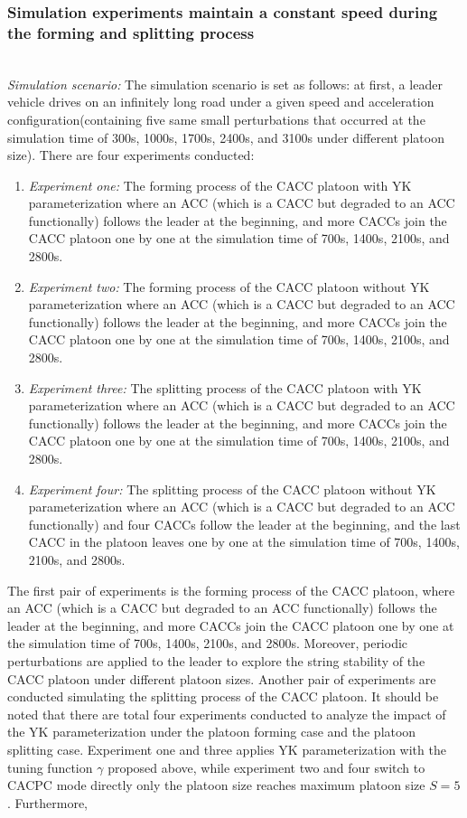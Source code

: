\documentclass[trsc,nonblindrev]{informs3} %
\begin{document}
\subsubsection{Simulation experiments maintain a constant speed during the forming and splitting process}
\label{Section 5.2.1}

~\\

\textit{Simulation scenario:} The simulation scenario is set as follows: at first, a leader vehicle drives on an infinitely long road under a given speed and acceleration configuration(containing five same small perturbations that occurred at the simulation time of 300s, 1000s, 1700s, 2400s, and 3100s under different platoon size). There are four experiments conducted:
\begin{enumerate}
    \item \textit{Experiment one:} The forming process of the CACC platoon with YK parameterization where an ACC (which is a CACC but degraded to an ACC functionally) follows the leader at the beginning, and more CACCs join the CACC platoon one by one at the simulation time of 700s, 1400s, 2100s, and 2800s.
    \item \textit{Experiment two:} The forming process of the CACC platoon without YK parameterization where an ACC (which is a CACC but degraded to an ACC functionally) follows the leader at the beginning, and more CACCs join the CACC platoon one by one at the simulation time of 700s, 1400s, 2100s, and 2800s.
    \item \textit{Experiment three:} The splitting process of the CACC platoon with YK parameterization where an ACC (which is a CACC but degraded to an ACC functionally) follows the leader at the beginning, and more CACCs join the CACC platoon one by one at the simulation time of 700s, 1400s, 2100s, and 2800s.
    \item \textit{Experiment four:} The splitting process of the CACC platoon without YK parameterization where an ACC (which is a CACC but degraded to an ACC functionally) and four CACCs follow the leader at the beginning, and the last CACC in the platoon leaves one by one at the simulation time of 700s, 1400s, 2100s, and 2800s.
\end{enumerate}
The first pair of experiments is the forming process of the CACC platoon, where an ACC (which is a CACC but degraded to an ACC functionally) follows the leader at the beginning, and more CACCs join the CACC platoon one by one at the simulation time of 700s, 1400s, 2100s, and 2800s. Moreover, periodic perturbations are applied to the leader to explore the string stability of the CACC platoon under different platoon sizes. Another pair of experiments are conducted simulating the splitting process of the CACC platoon. It should be noted that there are total four experiments conducted to analyze the impact of the YK parameterization under the platoon forming case and the platoon splitting case. Experiment one and three applies YK parameterization with the tuning function $\gamma$ proposed above, while experiment two and four switch to CACPC mode directly only the platoon size reaches maximum platoon size $S=5$. Furthermore,
\end{document}
